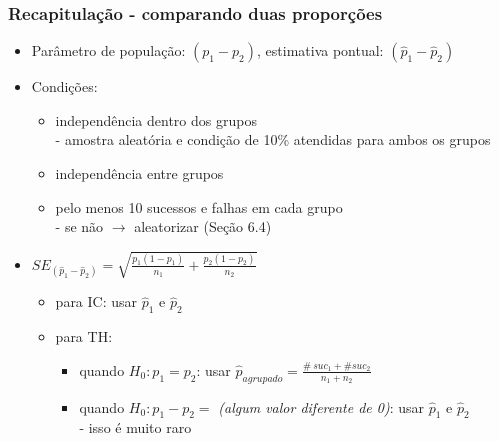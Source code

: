 \begin{frame}
\frametitle{Recapitulação - comparando duas proporções}

\begin{itemize}
\justifying
\item Parâmetro de população: $(p_1 - p_2)$, estimativa pontual: $(\hat{p}_1 - \hat{p}_2)$

\pause

\item Condições:
\pause
\begin{itemize}
\justifying
\item independência dentro dos grupos \\
\justifying
- amostra aleatória e condição de 10\% atendidas para ambos os grupos
\justifying
\item independência entre grupos
\justifying
\item pelo menos 10 sucessos e falhas em cada grupo\\ 
\justifying
- se não $\rightarrow$ aleatorizar (Seção 6.4)
\end{itemize}

\pause
\justifying
\item $SE_{(\hat{p}_1 - \hat{p}_2)} = \sqrt{ \frac{p_1(1-p_1)}{n_1} + \frac{p_2(1-p_2)}{n_2} }$
\begin{itemize}
\justifying
\item para IC: usar $\hat{p}_1$ e $\hat{p}_2$
\justifying
\item para TH:
\begin{itemize}
\justifying
\item quando $H_0: p_1 = p_2$: usar $\hat{p}_{agrupado} = \frac{\#~suc_1 + \#suc_2}{n_1 + n_2}$
\justifying
\item quando $H_0: p_1 - p_2 = $ \textit{(algum valor diferente de 0)}: usar $\hat{p}_1$ e $\hat{p}_2$ \\
- isso é muito raro
\end{itemize}
\end{itemize}

\end{itemize}

\end{frame}


